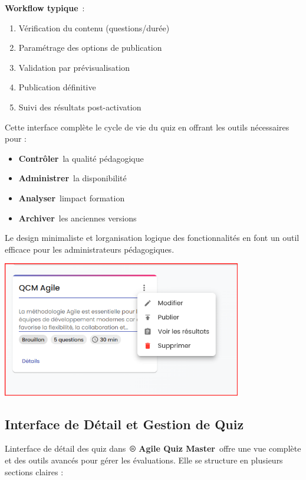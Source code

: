 \documentclass[12pt,a4paper,twoside,openright]{report}
\begin{document}
\textbf{Workflow typique}~:

\begin{enumerate}
\def\labelenumi{\arabic{enumi}.}
\item
  Vérification du contenu (questions/durée)
\item
  Paramétrage des options de publication
\item
  Validation par prévisualisation
\item
  Publication définitive
\item
  Suivi des résultats post-activation
\end{enumerate}

Cette interface complète le cycle de vie du quiz en offrant les outils
nécessaires pour :

\begin{itemize}
\item
  \textbf{Contrôler}~la qualité pédagogique
\item
  \textbf{Administrer}~la disponibilité
\item
  \textbf{Analyser}~l\textquotesingle impact formation
\item
  \textbf{Archiver}~les anciennes versions
\end{itemize}

Le design minimaliste et l\textquotesingle organisation logique des
fonctionnalités en font un outil efficace pour les administrateurs
pédagogiques.

\includegraphics[width=4.11827in,height=2.32651in]{latex_media/media/image59.png}

\hypertarget{interface-de-duxe9tail-et-gestion-de-quiz}{%
\subsection{Interface de Détail et Gestion de
Quiz}\label{interface-de-duxe9tail-et-gestion-de-quiz}}

L\textquotesingle interface de détail des quiz dans~\textbf{® Agile Quiz
Master}~offre une vue complète et des outils avancés pour gérer les
évaluations. Elle se structure en plusieurs sections claires :
\end{document}

